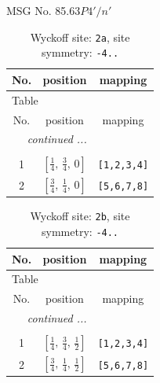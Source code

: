 \documentclass[fleqn,8pt]{jsarticle}
\begin{document}
\setcounter{MaxMatrixCols}{32}

\renewcommand{\tablename}{Table~}
\renewcommand{\figurename}{Figure~}
\begin{center}
\LARGE
MSG No. 85.63\quad$P4'/n'$
\end{center}
\renewcommand{\arraystretch}{1.2}
\begin{longtable}{ccc}
\caption{Wyckoff site: {\tt 2a}, site symmetry: {\tt -4..}}
 \\
 \hline \hline
No. & position & mapping \\ \hline \endfirsthead

\multicolumn{2}{l}{\tablename\ \thetable{}} \\
 \hline \hline
No. & position & mapping \\ \hline \endhead

 \hline \hline
\multicolumn{2}{r}{\footnotesize\it continued ...} \\ \endfoot

 \hline \hline
\multicolumn{2}{r}{} \\ \endlastfoot

1 & $\left[ \frac{1}{4},\, \frac{3}{4},\, 0 \right]$ & {\tt [1,2,3,4]} \\ \hline
2 & $\left[ \frac{3}{4},\, \frac{1}{4},\, 0 \right]$ & {\tt [5,6,7,8]} \\
\end{longtable}
\renewcommand{\arraystretch}{1.2}
\begin{longtable}{ccc}
\caption{Wyckoff site: {\tt 2b}, site symmetry: {\tt -4..}}
 \\
 \hline \hline
No. & position & mapping \\ \hline \endfirsthead

\multicolumn{2}{l}{\tablename\ \thetable{}} \\
 \hline \hline
No. & position & mapping \\ \hline \endhead

 \hline \hline
\multicolumn{2}{r}{\footnotesize\it continued ...} \\ \endfoot

 \hline \hline
\multicolumn{2}{r}{} \\ \endlastfoot

1 & $\left[ \frac{1}{4},\, \frac{3}{4},\, \frac{1}{2} \right]$ & {\tt [1,2,3,4]} \\ \hline
2 & $\left[ \frac{3}{4},\, \frac{1}{4},\, \frac{1}{2} \right]$ & {\tt [5,6,7,8]} \\
\end{longtable}
\end{document}
